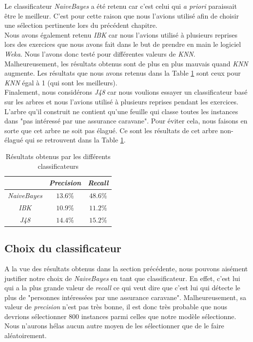 \documentclass[10pt,a4paper]{article}
\begin{document}
				Le classificateur \textit{NaiveBayes} a été retenu car c'est celui qui \textit{a priori} paraissait être le meilleur. C'est pour cette raison que nous l'avions utilisé afin de choisir une sélection pertinente lors du précédent chapitre.\\
				
				Nous avons également retenu \textit{IBK} car nous l'avions utilisé à plusieurs reprises lors des exercices que nous avons fait dans le but de prendre en main le logiciel \textit{Weka}. Nous l'avons donc testé pour différentes valeurs de \textit{KNN}. Malheureusement, les résultats obtenus sont de plus en plus mauvais quand \textit{KNN} augmente. Les résultats que nous avons retenus dans la Table \ref{tab:classificateur} sont ceux pour \textit{KNN} égal à 1 (qui sont les meilleurs).\\
				
				Finalement, nous considérons \textit{J48} car nous voulions essayer un classificateur basé sur les arbres et nous l'avions utilisé à plusieurs reprises pendant les exercices. L'arbre qu'il construit ne contient qu'une feuille qui classe toutes les instances dans "pas intéressé par une assurance caravane". Pour éviter cela, nous faisons en sorte que cet arbre ne soit pas élagué. Ce sont les résultats de cet arbre non-élagué qui se retrouvent dans la Table \ref{tab:classificateur}.		
				
				
				\begin{table}[h]
					\centering
					\caption{Résultats obtenus par les différents classificateurs}
					\label{tab:classificateur}
					\begin{tabular}{|c|c|c|}
						\hline
						& \textit{Precision} & \textit{Recall} \\
						\hline
						\textit{NaiveBayes} & $13.6\%$ & $48.6\%$\\
						\hline
						\textit{IBK} & $10.9\%$ & $11.2\%$\\
						\hline
						\textit{J48} & $14.4\%$ & $15.2\%$\\
						\hline
					\end{tabular}
				\end{table}
				
			\subsection{Choix du classificateur}
          	
	          	A la vue des résultats obtenus dans la section précédente, nous pouvons aisément justifier notre choix de \textit{NaiveBayes} en tant que classificateur. En effet, c'est lui qui a la plus grande valeur de \textit{recall} ce qui veut dire que c'est lui qui détecte le plus de "personnes intéressées par une assurance caravane". Malheureusement, sa valeur de \textit{precision} n'est pas très bonne, il est donc très probable que nous devrions sélectionner 800 instances parmi celles que notre modèle sélectionne. Nous n'aurons hélas aucun autre moyen de les sélectionner que de le faire aléatoirement.
	          
\end{document}
